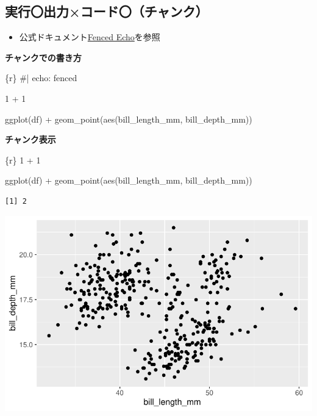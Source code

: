 \documentclass[
  b5paper,
  xelatex, ja=standard]{bxjsbook}
\newenvironment{Shaded}{\begin{snugshade}}{\end{snugshade}}
\newcommand{\InformationTok}[1]{\textcolor[rgb]{0.37,0.37,0.37}{#1}}
\providecommand{\tightlist}{%
  \setlength{\itemsep}{0pt}\setlength{\parskip}{0pt}}\usepackage{longtable,booktabs,array}
\begin{document}
\subsection{実行〇\textbar 出力×\textbar コード〇（チャンク）}

\begin{itemize}
\tightlist
\item
  公式ドキュメント\href{https://quarto.org/docs/computations/execution-options.html\#fenced-echo}{Fenced
  Echo}を参照
\end{itemize}

\textbf{チャンクでの書き方}

\begin{Shaded}
\begin{Highlighting}[]
\InformationTok{\textasciigrave{}\textasciigrave{}\textasciigrave{}\{r\}}
\InformationTok{\#| echo: fenced}

\InformationTok{1 + 1}


\InformationTok{ggplot(df) +}
\InformationTok{  geom\_point(aes(bill\_length\_mm, bill\_depth\_mm))}
\InformationTok{\textasciigrave{}\textasciigrave{}\textasciigrave{}}
\end{Highlighting}
\end{Shaded}

\textbf{チャンク表示}

\begin{Shaded}
\begin{Highlighting}[]
\InformationTok{\textasciigrave{}\textasciigrave{}\textasciigrave{}\{r\}}
\InformationTok{1 + 1}


\InformationTok{ggplot(df) +}
\InformationTok{  geom\_point(aes(bill\_length\_mm, bill\_depth\_mm))}
\InformationTok{\textasciigrave{}\textasciigrave{}\textasciigrave{}}
\end{Highlighting}
\end{Shaded}

\begin{verbatim}
[1] 2
\end{verbatim}

\includegraphics{basic_files/figure-pdf/unnamed-chunk-9-1.pdf}
\end{document}
